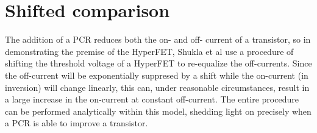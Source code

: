 \documentclass[letterpaper]{article}
\newcommand{\Vth}{\ensuremath{V_\mathrm{th}}}
\newcommand{\Rins}{\ensuremath{R_\mathrm{ins}}}
\newcommand{\Rmet}{\ensuremath{R_\mathrm{met}}}
\begin{document}
%
%
%
%
\section{Shifted comparison}
The addition of a PCR reduces both the on- and off- current of a transistor, so in demonstrating the premise of the HyperFET, Shukla et al \cite{Shukla_2015} use a procedure of shifting the threshold voltage of a HyperFET to re-equalize the off-currents.  Since the off-current will be exponentially suppresed by a shift while the on-current (in inversion) will change linearly, this can, under reasonable circumstances, result in a large increase in the on-current at constant off-current.  The entire procedure can be performed analytically within this model, shedding light on precisely when a PCR is able to improve a transistor.  
\end{document}

